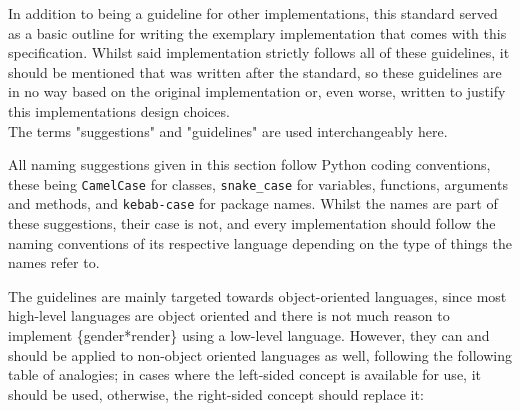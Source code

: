 \documentclass{article}
\newcounter{subsubsubsection}[subsubsection]
\begin{document}
    In addition to being a guideline for other implementations, this standard served as a basic outline for writing the exemplary implementation that comes with this specification.
    Whilst said implementation strictly follows all of these guidelines, it should be mentioned that was written after the standard, so these guidelines are in no way based on the original implementation or, even worse, written to justify this implementations design choices.\\

    The terms "suggestions" and "guidelines" are used interchangeably here.


    All naming suggestions given in this section follow Python coding conventions, these being \texttt{CamelCase} for classes, \texttt{snake\_case} for variables, functions, arguments and methods, and \texttt{kebab-case} for package names.
    Whilst the names are part of these suggestions, their case is not, and every implementation should follow the naming conventions of its respective language depending on the type of things the names refer to.


    The guidelines are mainly targeted towards object-oriented languages, since most high-level languages are object oriented and there is not much reason to implement \{gender*render\} using a low-level language.
    However, they can and should be applied to non-object oriented languages as well, following the following table of analogies;
    in cases where the left-sided concept is available for use, it should be used, otherwise, the right-sided concept should replace it:
\end{document}

